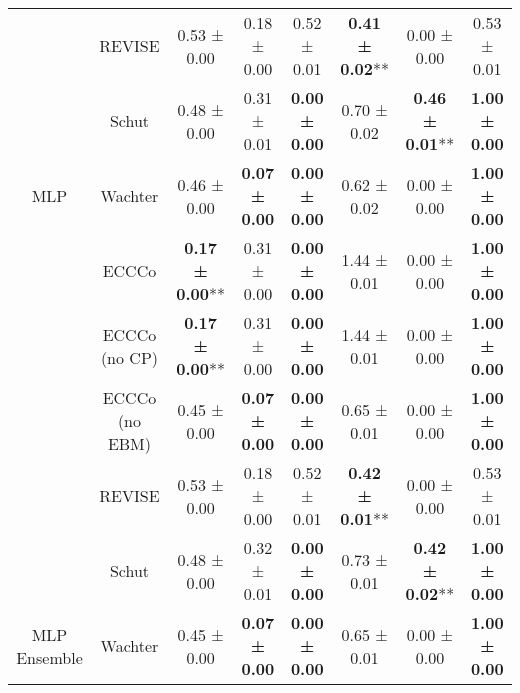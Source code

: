 \begin{table}
{\begin{tabular}[t]{cccccccc}
 & REVISE & 0.53 ± 0.00\hphantom{*}\hphantom{*} & 0.18 ± 0.00\hphantom{*}\hphantom{*} & 0.52 ± 0.01\hphantom{*}\hphantom{*} & \textbf{0.41 ± 0.02}** & 0.00 ± 0.00\hphantom{*}\hphantom{*} & 0.53 ± 0.01\hphantom{*}\hphantom{*}\\

 & Schut & 0.48 ± 0.00\hphantom{*}\hphantom{*} & 0.31 ± 0.01\hphantom{*}\hphantom{*} & \textbf{0.00 ± 0.00}\hphantom{*}\hphantom{*} & 0.70 ± 0.02\hphantom{*}\hphantom{*} & \textbf{0.46 ± 0.01}** & \textbf{1.00 ± 0.00}\hphantom{*}\hphantom{*}\\

\multirow[t]{-6}{*}{\centering\arraybackslash MLP} & Wachter & 0.46 ± 0.00\hphantom{*}\hphantom{*} & \textbf{0.07 ± 0.00}\hphantom{*}\hphantom{*} & \textbf{0.00 ± 0.00}\hphantom{*}\hphantom{*} & 0.62 ± 0.02\hphantom{*}\hphantom{*} & 0.00 ± 0.00\hphantom{*}\hphantom{*} & \textbf{1.00 ± 0.00}\hphantom{*}\hphantom{*}\\
\cmidrule{1-8}
 & ECCCo & \textbf{0.17 ± 0.00}** & 0.31 ± 0.00\hphantom{*}\hphantom{*} & \textbf{0.00 ± 0.00}\hphantom{*}\hphantom{*} & 1.44 ± 0.01\hphantom{*}\hphantom{*} & 0.00 ± 0.00\hphantom{*}\hphantom{*} & \textbf{1.00 ± 0.00}\hphantom{*}\hphantom{*}\\

 & ECCCo (no CP) & \textbf{0.17 ± 0.00}** & 0.31 ± 0.00\hphantom{*}\hphantom{*} & \textbf{0.00 ± 0.00}\hphantom{*}\hphantom{*} & 1.44 ± 0.01\hphantom{*}\hphantom{*} & 0.00 ± 0.00\hphantom{*}\hphantom{*} & \textbf{1.00 ± 0.00}\hphantom{*}\hphantom{*}\\

 & ECCCo (no EBM) & 0.45 ± 0.00\hphantom{*}\hphantom{*} & \textbf{0.07 ± 0.00}\hphantom{*}\hphantom{*} & \textbf{0.00 ± 0.00}\hphantom{*}\hphantom{*} & 0.65 ± 0.01\hphantom{*}\hphantom{*} & 0.00 ± 0.00\hphantom{*}\hphantom{*} & \textbf{1.00 ± 0.00}\hphantom{*}\hphantom{*}\\

 & REVISE & 0.53 ± 0.00\hphantom{*}\hphantom{*} & 0.18 ± 0.00\hphantom{*}\hphantom{*} & 0.52 ± 0.01\hphantom{*}\hphantom{*} & \textbf{0.42 ± 0.01}** & 0.00 ± 0.00\hphantom{*}\hphantom{*} & 0.53 ± 0.01\hphantom{*}\hphantom{*}\\

 & Schut & 0.48 ± 0.00\hphantom{*}\hphantom{*} & 0.32 ± 0.01\hphantom{*}\hphantom{*} & \textbf{0.00 ± 0.00}\hphantom{*}\hphantom{*} & 0.73 ± 0.01\hphantom{*}\hphantom{*} & \textbf{0.42 ± 0.02}** & \textbf{1.00 ± 0.00}\hphantom{*}\hphantom{*}\\

\multirow[t]{-6}{*}{\centering\arraybackslash MLP Ensemble} & Wachter & 0.45 ± 0.00\hphantom{*}\hphantom{*} & \textbf{0.07 ± 0.00}\hphantom{*}\hphantom{*} & \textbf{0.00 ± 0.00}\hphantom{*}\hphantom{*} & 0.65 ± 0.01\hphantom{*}\hphantom{*} & 0.00 ± 0.00\hphantom{*}\hphantom{*} & \textbf{1.00 ± 0.00}\hphantom{*}\hphantom{*}\\
\bottomrule
\end{tabular}}
\end{table}
